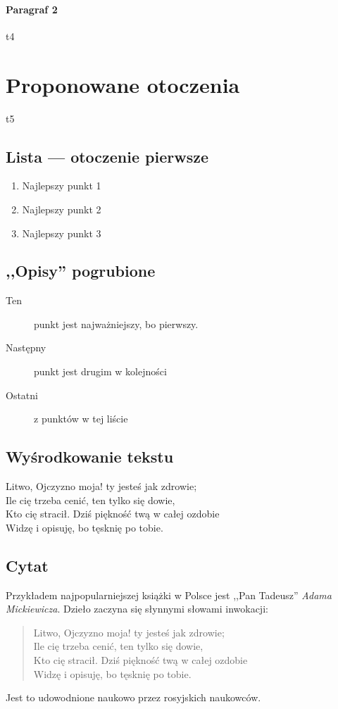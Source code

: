 \documentclass [a4paper, fleqn, 12pt, twoside] {mwbk}
\begin{document}
		\paragraph {Paragraf 2}
		 {t4}


\section {Proponowane otoczenia}
 {t5}
	\subsection {Lista --- otoczenie pierwsze}
		\begin {enumerate}
			\item {Najlepszy punkt 1}
			\item {Najlepszy punkt 2}
			\item {Najlepszy punkt 3}
		\end {enumerate}


	\subsection {,,Opisy'' pogrubione}
		\begin {description}
		\item [Ten] {punkt jest najważniejszy, bo pierwszy.}
		\item [Następny] {punkt jest drugim w kolejności}
		\item [Ostatni] {z punktów w tej liście}
		\end {description}
	
	\subsection {Wyśrodkowanie tekstu}
		\begin {center}
		Litwo, Ojczyzno moja! ty jesteś jak zdrowie; \\
		Ile cię trzeba cenić, ten tylko się dowie, \\
		Kto cię stracił. Dziś piękność twą w całej ozdobie \\
		Widzę i opisuję, bo tęsknię po tobie. \\
		\end {center}

	\subsection {Cytat}
		Przykładem najpopularniejszej książki w Polsce jest
		,,Pan Tadeusz'' \textit{Adama Mickiewicza}.
		Dzieło zaczyna się słynnymi słowami inwokacji:
		\begin {quote}
		Litwo, Ojczyzno moja! ty jesteś jak zdrowie; \\
		Ile cię trzeba cenić, ten tylko się dowie, \\
		Kto cię stracił. Dziś piękność twą w całej ozdobie \\
		Widzę i opisuję, bo tęsknię po tobie. \\
		\end {quote}
		Jest to udowodnione naukowo przez rosyjskich naukowców.
\end{document}
